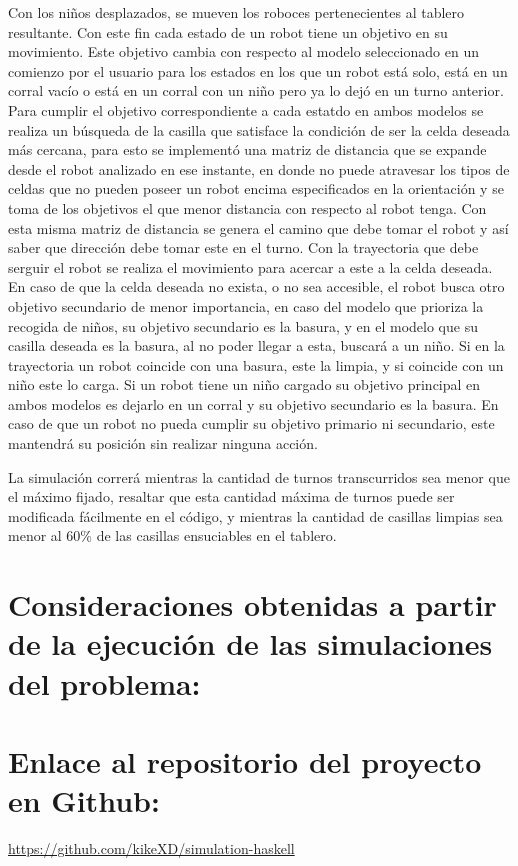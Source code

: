 \documentclass[titlepage,11pt]{scrartcl}
\begin{document}
Con los niños desplazados, se mueven los roboces pertenecientes al tablero resultante. Con este fin cada estado de un robot tiene un objetivo en su movimiento. Este objetivo cambia con respecto al modelo seleccionado en un comienzo por el usuario para los estados en los que un robot está solo, está en un corral vacío o está en un corral con un niño pero ya lo dejó en un turno anterior. Para cumplir el objetivo correspondiente a cada estatdo en ambos modelos se realiza un búsqueda de la casilla que satisface la condición de ser la celda deseada más cercana, para esto se implementó una matriz de distancia que se expande desde el robot analizado en ese instante, en donde no puede atravesar los tipos de celdas que no pueden poseer un robot encima especificados en la orientación y se toma de los objetivos el que menor distancia con respecto al robot tenga. Con esta misma matriz de distancia se genera el camino que debe tomar el robot y así saber que dirección debe tomar este en el turno. Con la trayectoria que debe serguir el robot se realiza el movimiento para acercar a este a la celda deseada. En caso de que la celda deseada no exista, o no sea accesible, el robot busca otro objetivo secundario de menor importancia, en caso del modelo que prioriza la recogida de niños, su objetivo secundario es la basura, y en el modelo que su casilla deseada es la basura, al no poder llegar a esta, buscará a un niño. Si en la trayectoria un robot coincide con una basura, este la limpia, y si coincide con un niño este lo carga. Si un robot tiene un niño cargado su objetivo principal en ambos modelos es dejarlo en un corral y su objetivo secundario es la basura. En caso de que un robot no pueda cumplir su objetivo primario ni secundario, este mantendrá su posición sin realizar ninguna acción.

La simulación correrá mientras la cantidad de turnos transcurridos sea menor que el máximo fijado, resaltar que esta cantidad máxima de turnos puede ser modificada fácilmente en el código, y mientras la cantidad de casillas limpias sea menor al 60\% de las casillas ensuciables en el tablero.

\section{Consideraciones obtenidas a partir de la ejecución de las simulaciones del problema:}

\section{Enlace al repositorio del proyecto en Github:}
\url{https://github.com/kikeXD/simulation-haskell}
\end{document}
